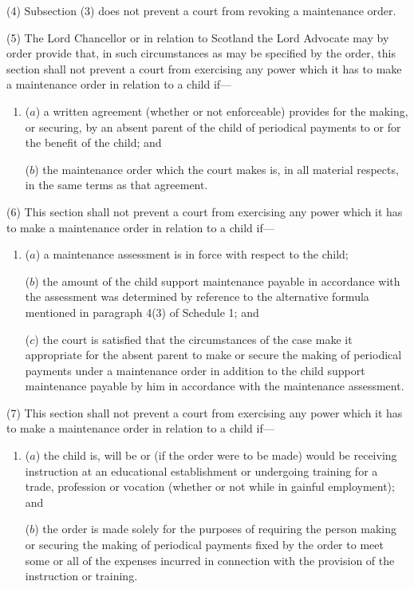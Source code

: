 \documentclass[12pt,a4paper]{article}
\begin{document}
(4) Subsection (3)  does not prevent a court from revoking a maintenance order.

(5) The Lord Chancellor or in relation to Scotland the Lord Advocate may by order provide that, in such circumstances as may be specified by the order, this section shall not prevent a court from exercising any power which it has to make a maintenance order in relation to a child if—
\begin{enumerate}\item[]
($a$) a written agreement (whether or not enforceable) provides for the making, or securing, by an absent parent of the child of periodical payments to or for the benefit of the child; and

($b$) the maintenance order which the court makes is, in all material respects, in the same terms as that agreement.
\end{enumerate}

(6) This section shall not prevent a court from exercising any power which it has to make a maintenance order in relation to a child if—
\begin{enumerate}\item[]
($a$) a maintenance assessment is in force with respect to the child;

($b$) the amount of the child support maintenance payable in accordance with the assessment was determined by reference to the alternative formula mentioned in paragraph 4(3)  of Schedule 1; and

($c$) the court is satisfied that the circumstances of the case make it appropriate for the absent parent to make or secure the making of periodical payments under a maintenance order in addition to the child support maintenance payable by him in accordance with the maintenance assessment.
\end{enumerate}

(7) This section shall not prevent a court from exercising any power which it has to make a maintenance order in relation to a child if—
\begin{enumerate}\item[]
($a$) the child is, will be or (if the order were to be made) would be receiving instruction at an educational establishment or undergoing training for a trade, profession or vocation (whether or not while in gainful employment); and

($b$) the order is made solely for the purposes of requiring the person making or securing the making of periodical payments fixed by the order to meet some or all of the expenses incurred in connection with the provision of the instruction or training.
\end{enumerate}
\end{document}
